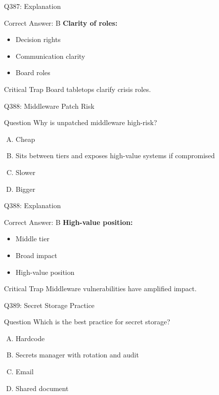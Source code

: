 \documentclass{beamer}
\begin{document}
	\begin{frame}{Q387: Explanation}
		\begin{block}{Correct Answer: B}
			\textbf{Clarity of roles:}
			\begin{itemize}
				\item Decision rights
				\item Communication clarity
				\item Board roles
			\end{itemize}
		\end{block}
		\begin{alertblock}{Critical Trap}
			Board tabletops clarify crisis roles.
		\end{alertblock}
	\end{frame}
	
	\begin{frame}{Q388: Middleware Patch Risk}
		\begin{block}{Question}
			Why is unpatched middleware high-risk?
		\end{block}
		\begin{enumerate}[(A)]
			\item Cheap
			\item Sits between tiers and exposes high-value systems if compromised
			\item Slower
			\item Bigger
		\end{enumerate}
	\end{frame}
	
	\begin{frame}{Q388: Explanation}
		\begin{block}{Correct Answer: B}
			\textbf{High-value position:}
			\begin{itemize}
				\item Middle tier
				\item Broad impact
				\item High-value position
			\end{itemize}
		\end{block}
		\begin{alertblock}{Critical Trap}
			Middleware vulnerabilities have amplified impact.
		\end{alertblock}
	\end{frame}
	
	\begin{frame}{Q389: Secret Storage Practice}
		\begin{block}{Question}
			Which is the best practice for secret storage?
		\end{block}
		\begin{enumerate}[(A)]
			\item Hardcode
			\item Secrets manager with rotation and audit
			\item Email
			\item Shared document
		\end{enumerate}
	\end{frame}
	
\end{document}
